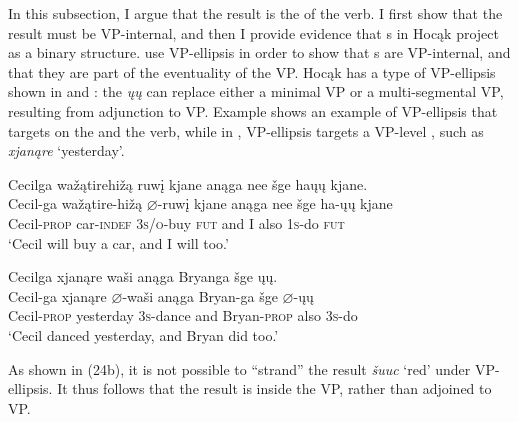 \documentclass[output=paper]{LSP/langsci}
\begin{document}
In this subsection, I argue that the result  is the  of the verb. I first show that the result  must be VP-internal, and then I provide evidence that s in Hocąk project as a binary structure. \citet{LevinRappaportHovav1995} use VP-ellipsis in order to show that s are VP-internal, and that they are part of the eventuality of the VP. Hocąk has a type of VP-ellipsis shown in  and : the  \textit{ųų} can replace either a minimal VP or a multi-segmental VP, resulting from adjunction to VP. Example  shows an example of VP-ellipsis that targets on the  and the verb, while in , VP-ellipsis targets a VP-level , such as \textit{xjanąre} `yesterday'.

\begin{exe}
\ex \label{ex:rosen:22}
\glll Cecilga {\ob}{\sVP} wažątirehižą ruwį{\cb} kjane anąga nee šge {\ob}haųų{\cb} kjane.\\
Cecil-ga {} wažątire-hižą {$\varnothing$}-ruwį kjane anąga nee šge ha-ųų kjane\\
Cecil-\textsc{prop} {} car-\textsc{indef} \textsc{3s/o}-buy \textsc{fut} and I also \textsc{1s}-do \textsc{fut}\\
\glt `Cecil will buy a car, and I will too.' \citep[5]{Johnson2013}

\ex \label{ex:rosen:23}
\glll Cecilga {\ob}{\sVP} xjanąre waši{\cb} anąga Bryanga šge {\ob}ųų{\cb}.\\
Cecil-ga {} xjanąre {$\varnothing$}-waši anąga Bryan-ga šge {$\varnothing$}-ųų\\
Cecil-\textsc{prop} {} yesterday \textsc{3s}-dance and Bryan-\textsc{prop} also \textsc{3s}-do\\
\glt `Cecil danced yesterday, and Bryan did too.' \citep[6a]{Johnson2013}

\end{exe}

As shown in (24b), it is not possible to ``strand'' the result  \textit{šuuc} `red' under VP-ellipsis. It thus follows that the result is inside the VP, rather than adjoined to VP.
\end{document}
